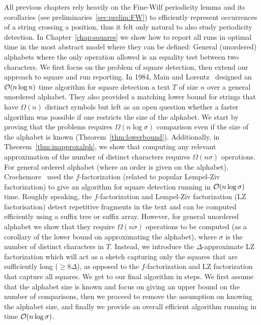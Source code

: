 All previous chapters rely heavily on the Fine-Wilf periodicity lemma and its corollaries (see preliminaries~\ref{sec:prelim:FW}) to efficiently represent occurrences of a string crossing a position, thus it felt only natural to also study periodicity detection. In Chapter~\ref{chap:squares} we show how to report all runs  in optimal time in the most abstract model where they can be defined: General (unordered) alphabets where the only operation allowed is an equality test between two characters. 
We first focus on the problem of square detection, then extend our approach to square and run reporting.
In 1984, Main and Lorentz~\cite{Main1984} designed an $\mathcal{O}(n\log n)$ time algorithm for square detection a text $T$ of size $n$ over a general unordered alphabet. They also provided a matching lower bound for strings that have $\Omega(n)$ distinct symbols but left as an open question whether a faster algorithm was possible if one restricts the size of the alphabet.
We start by proving that the problems requires $\Omega(n \log \sigma)$ comparison even if the size of the alphabet is known (Theorem~\ref{thm:lowerbound}). Additionally, in Theorem~\ref{thm:inapproxalph}, we show that computing any relevant approximation of the number of distinct characters requires $\Omega(n\sigma)$ operations.
For general ordered alphabet (where an order is given on the alphabet), Crochemore~\cite{Crochemore1986} used the $f$-factorization (related to popular Lempel-Ziv factorization) to give an algorithm for square detection running in $\mathcal{O}(n\log \sigma)$ time. Roughly speaking, the $f$-factorization and Lempel-Ziv factorization (LZ factorisation) detect repetitive fragments in the text and can be computed efficiently using a suffix tree or suffix array. However, for general unordered alphabet we show that they require $\Omega(n\sigma)$ operations to be computed (as a corollary of the lower bound on approximating the alphabet), where $\sigma$ is the number of distinct characters in $T$.
Instead, we introduce the $\Delta$-approximate LZ factorization which will act as a sketch capturing only the squares that are sufficiently long ($\geq 8\Delta$), as opposed to the $f$-factorization and LZ factorization that capture all squares.
We get to our final algorithm in steps. We first assume that the alphabet size is known and focus on giving an upper bound on the number of comparisons, then we proceed to remove the assumption on knowing the alphabet size, and finally we provide an overall efficient algorithm running in time $\mathcal{O}(n\log\sigma)$.




